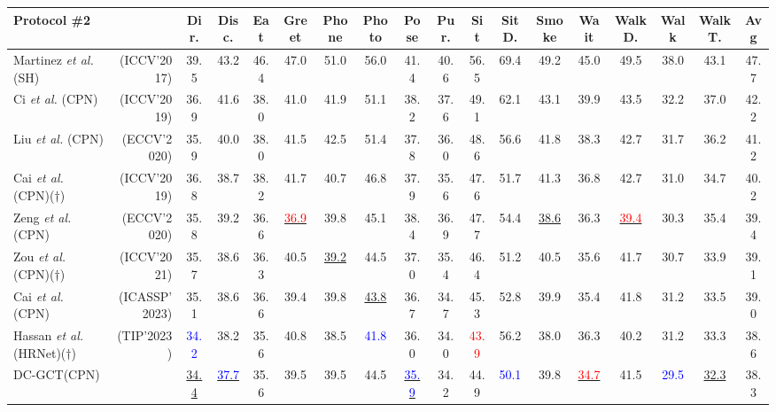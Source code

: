 \documentclass[journal]{IEEEtran}
\begin{document}
\begin{table*}[htbp]
{\begin{tabular}{lr|ccccccccccccccc|c}
\toprule[1mm]



\bf{Protocol \#2} &                              & Dir. & Disc. & Eat & Greet & Phone & Photo & Pose & Pur. & Sit & SitD. & Smoke & Wait & WalkD. & Walk & WalkT. & Avg \\
\hline
Martinez \textit{et al.} \cite{martinez2017simple}(SH) &(ICCV'2017) &39.5 &43.2 &46.4 &47.0 &51.0 &56.0 &41.4 &40.6 &56.5 &69.4 &49.2 &45.0 &49.5 &38.0 &43.1 &47.7 \\
Ci \textit{et al.} \cite{ci2019optimizing}(CPN) &(ICCV'2019) &36.9 &41.6 &38.0 &41.0 &41.9 &51.1 &38.2 &37.6 &49.1 &62.1 &43.1 &39.9 &43.5 &32.2 &37.0 &42.2 \\
Liu \textit{et al.} \cite{liu2020comprehensive} (CPN)&(ECCV'2020) &35.9 &40.0 &38.0 &41.5 &42.5 &51.4 &37.8 &36.0 &48.6 &56.6 &41.8 &38.3 &42.7 &31.7 &36.2 &41.2 \\
Cai \textit{et al.} \cite{cai2019exploiting} (CPN)($\dagger$) &(ICCV'2019) &36.8 &38.7 &38.2 &41.7 &40.7 &46.8 &37.9 &35.6 &47.6 &51.7 &41.3 &36.8 &42.7 &31.0 &34.7 &40.2 \\
Zeng \textit{et al.} \cite{zeng2020srnet} (CPN)&(ECCV'2020) &35.8 &39.2 &36.6 &\underline{ \textcolor{red}{36.9}} &39.8 &45.1 &38.4 &36.9 &47.7 &54.4 &\underline{38.6} &36.3 &\underline{ \textcolor{red}{39.4}} &30.3 &35.4 &39.4 \\
Zou \textit{et al.} \cite{zou2021modulated}(CPN)($\dagger$)  &(ICCV'2021) &35.7 &38.6 &36.3 &40.5 &\underline{39.2} &44.5 &37.0 &35.4 &46.4 &51.2 &40.5 &35.6 &41.7 &30.7 &33.9 &39.1 \\

Cai \textit{et al.} \cite{cai2023htnet}(CPN) &(ICASSP'2023) &35.1 &38.6 &36.6 &39.4 &39.8 &\underline{43.8} &36.7 &34.7 &45.3 &52.8 &39.9 &35.4 &41.8 &31.2 &33.5 &39.0 \\

Hassan \textit{et al.} \cite{hassan2023regular}(HRNet)($\dagger$) &(TIP'2023) &\textcolor{blue}{34.2} &38.2 &35.6 &40.8 &38.5 &\textcolor{blue}{41.8} &36.0 &34.0 &\textcolor{red}{43.9} &56.2 &38.0 &36.3 &40.2 &31.2 &33.3 &38.6 \\




\hline
DC-GCT(CPN)  &                       &\underline{34.4} &\underline{ \textcolor{blue}{37.7}} &35.6 &39.5 &39.5 &44.5 &\underline{ \textcolor{blue}{35.9}} &34.2 &44.9 &\textcolor{blue}{50.1} &39.8 &\underline{ \textcolor{red}{34.7}} &41.5 &\textcolor{blue}{29.5} &\underline{32.3} &38.3 \\ 


\end{tabular}}
\end{table*}
\end{document}
